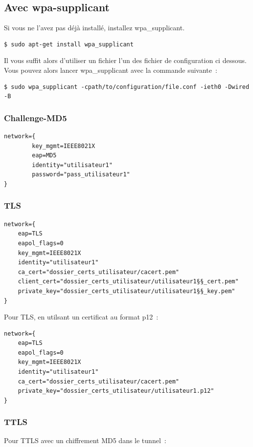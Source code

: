 \subsection{Avec wpa-supplicant}
Si vous ne l'avez pas déjà installé, installez wpa\_supplicant.
\begin{lstlisting}
$ sudo apt-get install wpa_supplicant
\end{lstlisting}
Il vous suffit alors d'utiliser un fichier l'un des fichier de configuration ci dessous.
Vous pouvez alors lancer wpa\_supplicant avec la commande suivante~:
\begin{lstlisting}
$ sudo wpa_supplicant -cpath/to/configuration/file.conf -ieth0 -Dwired -B
\end{lstlisting}


\subsubsection{Challenge-MD5}
\begin{lstlisting}
network={
        key_mgmt=IEEE8021X
        eap=MD5
        identity="utilisateur1"
        password="pass_utilisateur1"
}
\end{lstlisting}




\subsubsection{TLS}
\begin{lstlisting}
network={
    eap=TLS
    eapol_flags=0
    key_mgmt=IEEE8021X
    identity="utilisateur1"
    ca_cert="dossier_certs_utilisateur/cacert.pem"
    client_cert="dossier_certs_utilisateur/utilisateur1§§_cert.pem"
    private_key="dossier_certs_utilisateur/utilisateur1§§_key.pem"
}
\end{lstlisting}

Pour TLS, en utilsant un certificat au format p12~: 

\begin{lstlisting}
network={
    eap=TLS
    eapol_flags=0
    key_mgmt=IEEE8021X
    identity="utilisateur1"
    ca_cert="dossier_certs_utilisateur/cacert.pem"
    private_key="dossier_certs_utilisateur/utilisateur1.p12"
}
\end{lstlisting}

\subsubsection{TTLS}
Pour TTLS avec un chiffrement MD5 dans le tunnel~:

